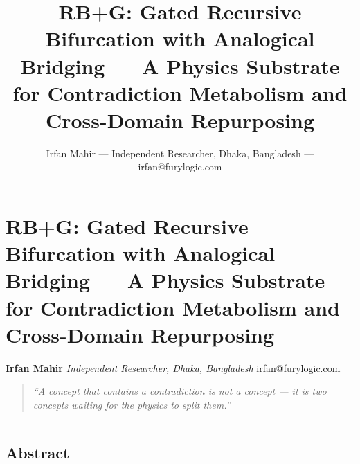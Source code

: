 \documentclass[
  11pt,
  a4paper,
]{article}
\title{RB+G: Gated Recursive Bifurcation with Analogical Bridging --- A
Physics Substrate for Contradiction Metabolism and Cross-Domain
Repurposing}
\author{Irfan Mahir --- Independent Researcher, Dhaka, Bangladesh ---
irfan@furylogic.com}
\date{}
\begin{document}
\maketitle

{
\hypersetup{linkcolor=}
\setcounter{tocdepth}{3}
\tableofcontents
}
\section{RB+G: Gated Recursive Bifurcation with Analogical Bridging ---
A Physics Substrate for Contradiction Metabolism and Cross-Domain
Repurposing}\label{rbg-gated-recursive-bifurcation-with-analogical-bridging-a-physics-substrate-for-contradiction-metabolism-and-cross-domain-repurposing}

\textbf{Irfan Mahir} \emph{Independent Researcher, Dhaka, Bangladesh}
irfan@furylogic.com

\begin{quote}
\emph{``A concept that contains a contradiction is not a concept --- it
is two concepts waiting for the physics to split them.''}
\end{quote}

\begin{center}\rule{0.5\linewidth}{0.5pt}\end{center}

\subsection{Abstract}\label{abstract}
\end{document}
